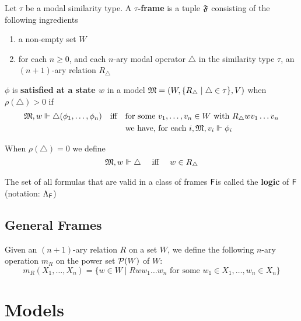 \documentclass[11pt]{article}
\begin{document}
\begin{definition}[]
Let \(\tau\) be a modal similarity type. A \textbf{\(\tau\)-frame} is a tuple \(\mathfrak{F}\)
consisting of the following ingredients
\begin{enumerate}
\item a non-empty set \(W\)
\item for each \(n\ge0\), and each \(n\)-ary modal operator \(\triangle\) in the
similarity type \(\tau\), an \((n+1)\)-ary relation \(R_{\triangle}\)
\end{enumerate}
\end{definition}

\(\phi\) is \textbf{satisfied at a state \(w\)} in a model
\(\mathfrak{M}=(W,\{R_{\triangle}\mid\triangle\in\tau\},V)\) when
\(\rho(\triangle)\iffalse<\fi>0\) if
\begin{align*}
\mathfrak{M},w\Vdash\triangle(\phi_1,\dots,\phi_n)\quad\text{iff}\quad&
\text{for some }v_1,\dots,v_n\in W\text{ with } R_{\triangle} wv_1\dots v_n\\
&\text{we have, for each }i,\mathfrak{M},v_i\Vdash\phi_i
\end{align*}

When \(\rho(\triangle)=0\) we define
\begin{equation*}
\mathfrak{M},w\Vdash\triangle \quad\text{ iff }\quad
w\in R_{\triangle}
\end{equation*}

\begin{definition}[]
The set of all formulas that are valid in a class of frames \(\textsf{F}\)is called
the \textbf{logic} of \(\textsf{F}\) (notation: \(\Lambda_{\textsf{F}}\))
\end{definition}

\subsection{General Frames}
\label{sec:orgc9a635b}
\begin{definition}[]
Given an \((n+1)\)-ary relation \(R\) on a set \(W\), we define the following
\(n\)-ary operation \(m_R\) on the power set \(\mathcal{P}(W)\) of \(W\):
\begin{equation*}
m_R(X_1,\dots,X_n)=\{w\in W\mid Rww_1\dots w_n\text{ for some }
w_1\in X_1,\dots,w_n\in X_n\}
\end{equation*}
\end{definition}

\section{Models}
\label{sec:orgfdebf86}
\end{document}
